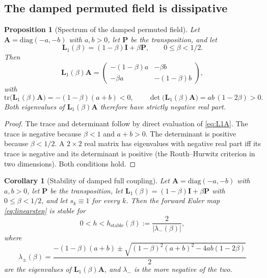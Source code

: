 \documentclass[12pt, a4paper]{article}
\theoremstyle{plain}
\newtheorem{proposition}{Proposition}
\newtheorem{corollary}{Corollary}
\theoremstyle{definition}
\theoremstyle{remark}
\newcommand{\bI}{\mathbf{I}}
\newcommand{\bP}{\mathbf{P}}
\newcommand{\bA}{\mathbf{A}}
\newcommand{\bL}{\mathbf{L}}
\begin{document}
\subsection{The damped permuted field is dissipative}

\begin{proposition}[Spectrum of the damped permuted field]
\label{prop:spectrum_damped}
Let $\bA = \mathrm{diag}(-a,-b)$ with $a,b>0$, let $\bP$ be the transposition,
and let
\begin{equation}
\bL_1(\beta) = (1-\beta)\bI + \beta\bP,
\qquad 0 \le \beta < 1/2.
\end{equation}
Then
\begin{equation}
\bL_1(\beta)\bA = \begin{pmatrix}
-(1-\beta)a & -\beta b \\
-\beta a     & -(1-\beta)b
\end{pmatrix},
\label{eq:L1A}
\end{equation}
with
\begin{equation}
\mathrm{tr}\big(\bL_1(\beta)\bA\big) = -(1-\beta)(a+b) < 0,
\qquad
\det\big(\bL_1(\beta)\bA\big) = ab\,(1 - 2\beta) > 0.
\label{eq:trace_det}
\end{equation}
Both eigenvalues of $\bL_1(\beta)\bA$ therefore have strictly negative real
part.
\end{proposition}

\begin{proof}
The trace and determinant follow by direct evaluation of \eqref{eq:L1A}. The
trace is negative because $\beta < 1$ and $a+b > 0$. The determinant is
positive because $\beta < 1/2$. A $2\times 2$ real matrix has eigenvalues with
negative real part iff its trace is negative and its determinant is positive
(the Routh--Hurwitz criterion in two dimensions). Both conditions hold.
\end{proof}

\begin{corollary}[Stability of damped full coupling]
\label{cor:stable_full}
Let $\bA = \mathrm{diag}(-a,-b)$ with $a,b>0$, let $\bP$ be the transposition,
let $\bL_1(\beta) = (1-\beta)\bI + \beta\bP$ with $0 \le \beta < 1/2$, and let
$s_k \equiv 1$ for every $k$. Then the forward Euler map \eqref{eq:linearstep}
is stable for
\begin{equation}
0 < h < h_{\mathrm{stable}}(\beta) := \frac{2}{|\lambda_-(\beta)|},
\label{eq:hstable_beta}
\end{equation}
where
\begin{equation}
\lambda_\pm(\beta) = \frac{-(1-\beta)(a+b) \pm \sqrt{(1-\beta)^2(a+b)^2 - 4ab(1-2\beta)}}{2}
\label{eq:lambda_beta}
\end{equation}
are the eigenvalues of $\bL_1(\beta)\bA$, and $\lambda_-$ is the more negative
of the two.
\end{corollary}
\end{document}
